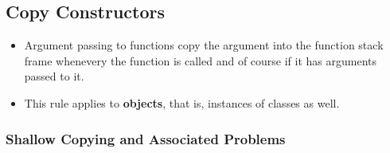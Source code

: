 \documentclass[10pt]{article}
\newcommand{\pbreak}{\vspace{30pt}}
\begin{document}
\newpage

\subsection{Copy Constructors}

\begin{itemize}
	\item Argument passing to functions copy the argument into the function stack frame whenevery the function is called and of course if it has arguments passed to it.

	\item This rule applies to \textbf{objects}, that is, instances of classes as well.
\end{itemize}

\pbreak

\subsubsection{Shallow Copying and Associated Problems}
\end{document}
